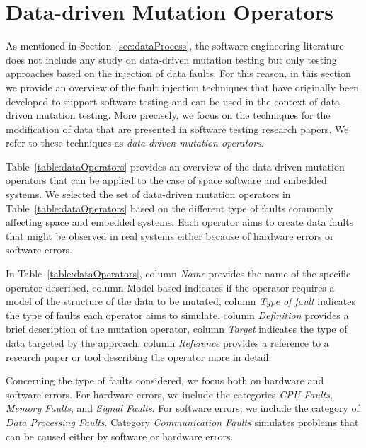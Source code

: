 
\section{Data-driven Mutation Operators}
\label{sec:data_operators}

As mentioned in Section~\ref{sec:dataProcess}, the software engineering literature does not include any study on data-driven mutation testing but only testing approaches based on the injection of data faults.
For this reason, 
in this section we provide an overview of the fault injection techniques that have originally been developed to support software testing and can be used in the context of data-driven mutation testing. 
More precisely, we focus on the techniques for the modification of data that are presented in software testing research papers.
We refer to these techniques as \emph{data-driven mutation operators}.

Table~\ref{table:dataOperators} provides an overview of the data-driven mutation operators that can be applied to the case of space software and embedded systems. 
We selected the set of data-driven mutation operators in Table~\ref{table:dataOperators} based on the different type of faults commonly affecting space and embedded systems. 
Each operator aims to create data faults that might be observed in real systems either because of hardware errors or software errors.

In Table~\ref{table:dataOperators}, column \emph{Name} provides the name of the specific operator described, column Model-based indicates if the operator requires a model of the structure of the data to be mutated, 
 column \emph{Type of fault} indicates the type of faults each operator aims to simulate,
 column \emph{Definition} provides a brief description of the mutation operator, column \emph{Target} indicates the type of data targeted by the approach,
 column \emph{Reference} provides a reference to a research paper or tool describing the operator more in detail.
 
Concerning the type of faults considered, we focus both on hardware and software errors.
For hardware errors, we include the categories \emph{CPU Faults}, \emph{Memory Faults}, and \emph{Signal Faults}. 
For software errors, we include the category of \emph{Data Processing Faults}.
Category \emph{Communication Faults} simulates problems that can be caused either by software or hardware errors.

